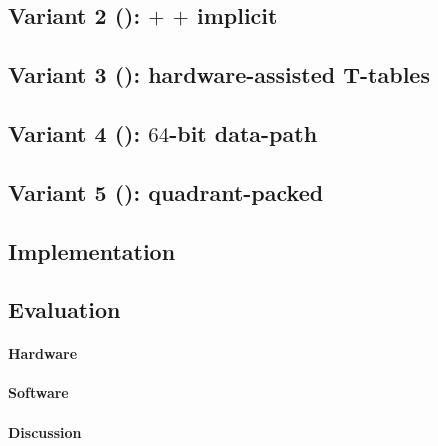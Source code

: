 \documentclass[preprint]{iacrtrans}
\begin{document}
\subsection{Variant 2 ():  $+$  $+$ implicit }
\label{sec:ise:design:v2}

\subsection{Variant 3 (): hardware-assisted T-tables}
\label{sec:ise:design:v3}

\subsection{Variant 4 (): $64$-bit data-path}
\label{sec:ise:design:v4}

\subsection{Variant 5 (): quadrant-packed}
\label{sec:ise:design:v5}



\subsection{Implementation}
\label{sec:ise:imp}



\subsection{Evaluation}

\paragraph{Hardware}
\label{sec:ise:eval:hw}


\paragraph{Software}
\label{sec:ise:eval:sw}


\paragraph{Discussion}
\label{sec:ise:eval:discuss}

\end{document}
